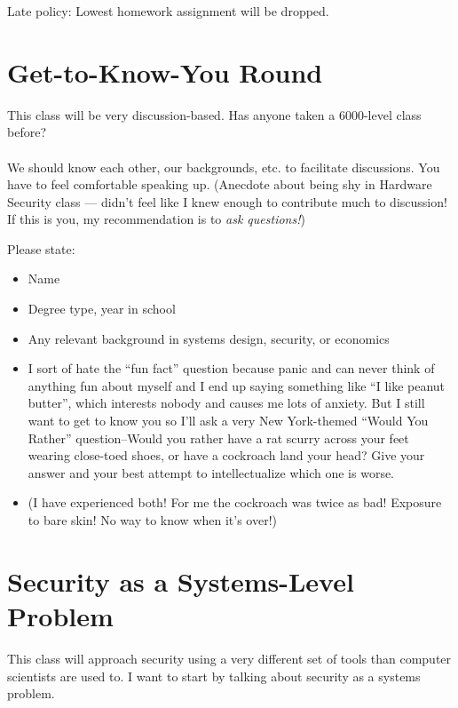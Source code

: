 \documentclass[11pt]{article}
\begin{document}
Late policy: Lowest homework assignment will be dropped. 

\section{Get-to-Know-You Round}

This class will be very discussion-based. Has anyone taken a 6000-level class before?
\\ \\ 
We should know each other, our backgrounds, etc. to facilitate discussions. You have to feel comfortable speaking up. (Anecdote about being shy in Hardware Security class --- didn't feel like I knew enough to contribute much to discussion! If this is you, my recommendation is to {\it ask questions!})

Please state:

\begin{itemize}
    \item Name
    \item Degree type, year in school
    \item Any relevant background in systems design, security, or economics
    \item I sort of hate the ``fun fact'' question because panic and can never think of anything fun about myself and I end up saying something like ``I like peanut butter'', which interests nobody and causes me lots of anxiety. 
    But I still want to get to know you so I'll ask a very New York-themed ``Would You Rather'' question--Would you rather have a rat scurry across your feet wearing close-toed shoes, or have a cockroach land your head? Give your answer and your best attempt to intellectualize which one is worse. 
    \item (I have experienced both! For me the cockroach was twice as bad! Exposure to bare skin! No way to know when it's over!)
\end{itemize}


\section{Security as a Systems-Level Problem}

This class will approach security using a very different set of tools than computer scientists are used to. I want to start by talking about security as a systems problem.
\end{document}
